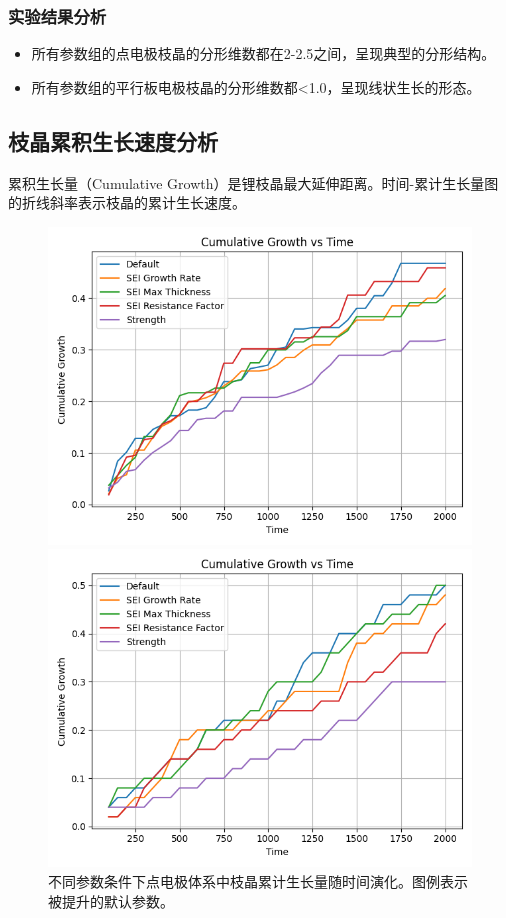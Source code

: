\documentclass{article}
\begin{document}
\subsubsection{实验结果分析}
 \begin{itemize}
     \item 所有参数组的点电极枝晶的分形维数都在2-2.5之间，呈现典型的分形结构。
     \item 所有参数组的平行板电极枝晶的分形维数都<1.0，呈现线状生长的形态。
 \end{itemize}
  \subsection{枝晶累积生长速度分析}
  累积生长量（Cumulative Growth）是锂枝晶最大延伸距离。时间-累计生长量图的折线斜率表示枝晶的累计生长速度。
        \begin{figure}[H]
               \centering
               \begin{minipage}{0.45\textwidth}
   \centering
    \includegraphics[scale=0.45]{figs/point_cumulative_growth_comparison.png}
   \caption{不同参数条件下点电极体系中枝晶累计生长量随时间演化。图例表示被提升的默认参数。}
               \end{minipage}
               \hfill %
               \begin{minipage}{0.45\textwidth}
    \centering
    \includegraphics[scale=0.45]{figs/parallel_cumulative_growth_comparison.png}

\end{minipage}
\end{figure}
\end{document}
